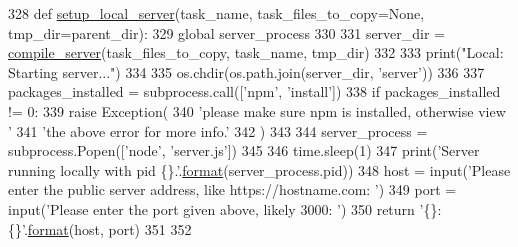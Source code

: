 \begin{DoxyCode}
328 \textcolor{keyword}{def }\hyperlink{namespaceparlai_1_1mturk_1_1core_1_1server__utils_a9d4c4937ea60bd74630a44739e825ebf}{setup\_local\_server}(task\_name, task\_files\_to\_copy=None, tmp\_dir=parent\_dir):
329     \textcolor{keyword}{global} server\_process
330 
331     server\_dir = \hyperlink{namespaceparlai_1_1mturk_1_1core_1_1dev_1_1server__utils_ab2ee72bd56197de749229032b05254da}{compile\_server}(task\_files\_to\_copy, task\_name, tmp\_dir)
332 
333     print(\textcolor{stringliteral}{"Local: Starting server..."})
334 
335     os.chdir(os.path.join(server\_dir, \textcolor{stringliteral}{'server'}))
336 
337     packages\_installed = subprocess.call([\textcolor{stringliteral}{'npm'}, \textcolor{stringliteral}{'install'}])
338     \textcolor{keywordflow}{if} packages\_installed != 0:
339         \textcolor{keywordflow}{raise} Exception(
340             \textcolor{stringliteral}{'please make sure npm is installed, otherwise view '}
341             \textcolor{stringliteral}{'the above error for more info.'}
342         )
343 
344     server\_process = subprocess.Popen([\textcolor{stringliteral}{'node'}, \textcolor{stringliteral}{'server.js'}])
345 
346     time.sleep(1)
347     print(\textcolor{stringliteral}{'Server running locally with pid \{\}.'}.\hyperlink{namespaceparlai_1_1chat__service_1_1services_1_1messenger_1_1shared__utils_a32e2e2022b824fbaf80c747160b52a76}{format}(server\_process.pid))
348     host = input(\textcolor{stringliteral}{'Please enter the public server address, like https://hostname.com: '})
349     port = input(\textcolor{stringliteral}{'Please enter the port given above, likely 3000: '})
350     \textcolor{keywordflow}{return} \textcolor{stringliteral}{'\{\}:\{\}'}.\hyperlink{namespaceparlai_1_1chat__service_1_1services_1_1messenger_1_1shared__utils_a32e2e2022b824fbaf80c747160b52a76}{format}(host, port)
351 
352 
\end{DoxyCode}
\mbox{\label{namespaceparlai_1_1mturk_1_1core_1_1dev_1_1server__utils_a13d7101c43eceb479444919d4e5f49fe}} 
